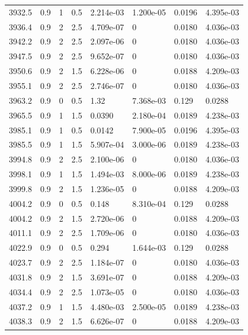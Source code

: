 \documentclass[preview]{standalone}
\begin{document}
{{{{{{{{{{{{{{{\begin{tabular}{L{1.2cm}C{1.2cm} C{0.3cm}C{0.5cm} C{1.4cm}C{1.4cm} C{1.4cm}C{1.4cm}}
  3932.5  &   0.9  & 1     & 0.5 &  2.214e-03  & 1.200e-05  & 0.0196 &  4.395e-03   \\ 
  3936.4  &   0.9  & 2     & 2.5 &  4.709e-07  & 0  & 0.0180 &  4.036e-03   \\ 
  3942.2  &   0.9  & 2     & 2.5 &  2.097e-06  & 0  & 0.0180 &  4.036e-03   \\ 
  3947.5  &   0.9  & 2     & 2.5 &  9.652e-07  & 0  & 0.0180 &  4.036e-03   \\ 
  3950.6  &   0.9  & 2     & 1.5 &  6.228e-06  & 0  & 0.0188 &  4.209e-03   \\ 
  3955.1  &   0.9  & 2     & 2.5 &  2.746e-07  & 0  & 0.0180 &  4.036e-03   \\ 
  3963.2  &   0.9  & 0     & 0.5 &  1.32  & 7.368e-03  & 0.129 &  0.0288   \\ 
  3965.5  &   0.9  & 1     & 1.5 &  0.0390  & 2.180e-04  & 0.0189 &  4.238e-03   \\ 
  3985.1  &   0.9  & 1     & 0.5 &  0.0142  & 7.900e-05  & 0.0196 &  4.395e-03   \\ 
  3985.5  &   0.9  & 1     & 1.5 &  5.907e-04  & 3.000e-06  & 0.0189 &  4.238e-03   \\ 
  3994.8  &   0.9  & 2     & 2.5 &  2.100e-06  & 0  & 0.0180 &  4.036e-03   \\ 
  3998.1  &   0.9  & 1     & 1.5 &  1.494e-03  & 8.000e-06  & 0.0189 &  4.238e-03   \\ 
  3999.8  &   0.9  & 2     & 1.5 &  1.236e-05  & 0  & 0.0188 &  4.209e-03   \\ 
  4004.2  &   0.9  & 0     & 0.5 &  0.148  & 8.310e-04  & 0.129 &  0.0288   \\ 
  4004.2  &   0.9  & 2     & 1.5 &  2.720e-06  & 0  & 0.0188 &  4.209e-03   \\ 
  4011.1  &   0.9  & 2     & 2.5 &  1.709e-06  & 0  & 0.0180 &  4.036e-03   \\ 
  4022.9  &   0.9  & 0     & 0.5 &  0.294  & 1.644e-03  & 0.129 &  0.0288   \\ 
  4023.7  &   0.9  & 2     & 2.5 &  1.184e-07  & 0  & 0.0180 &  4.036e-03   \\ 
  4031.8  &   0.9  & 2     & 1.5 &  3.691e-07  & 0  & 0.0188 &  4.209e-03   \\ 
  4034.4  &   0.9  & 2     & 2.5 &  1.073e-05  & 0  & 0.0180 &  4.036e-03   \\ 
  4037.2  &   0.9  & 1     & 1.5 &  4.480e-03  & 2.500e-05  & 0.0189 &  4.238e-03   \\ 
  4038.3  &   0.9  & 2     & 1.5 &  6.626e-07  & 0  & 0.0188 &  4.209e-03   \\ 

\end{tabular}}}}}}}}}}}}}}}}
\end{document}
